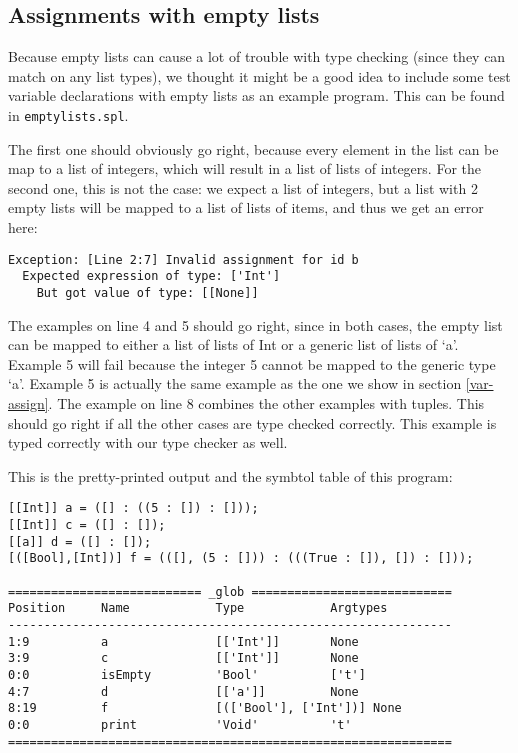 \documentclass[a4paper]{article}
\begin{document}
\subsection{Assignments with empty lists}
Because empty lists can cause a lot of trouble with type checking (since they can match on any list types), we thought it might be a good idea to include some test variable declarations with empty lists as an example program. This can be found in {\tt emptylists.spl}. 

The first one should obviously go right, because every element in the list can be map to a list of integers, which will result in a list of lists of integers. For the second one, this is not the case: we expect a list of integers, but a list with 2 empty lists will be mapped to a list of lists of items, and thus we get an error here:
\begin{verbatim}
Exception: [Line 2:7] Invalid assignment for id b
  Expected expression of type: ['Int']
    But got value of type: [[None]]
\end{verbatim}
The examples on line 4 and 5 should go right, since in both cases, the empty list can be mapped to either a list of lists of Int or a generic list of lists of `a'. Example 5 will fail because the integer 5 cannot be mapped to the generic type `a'. Example 5 is actually the same example as the one we show in section \ref{var-assign}. The example on line 8 combines the other examples with tuples. This should go right if all the other cases are type checked correctly. This example is typed correctly with our type checker as well.

This is the pretty-printed output and the symbtol table of this program: 
\begin{verbatim}
[[Int]] a = ([] : ((5 : []) : []));
[[Int]] c = ([] : []);
[[a]] d = ([] : []);
[([Bool],[Int])] f = (([], (5 : [])) : (((True : []), []) : []));

=========================== _glob ============================
Position     Name            Type            Argtypes            
--------------------------------------------------------------
1:9          a               [['Int']]       None                
3:9          c               [['Int']]       None                
0:0          isEmpty         'Bool'          ['t']               
4:7          d               [['a']]         None                
8:19         f               [(['Bool'], ['Int'])] None                
0:0          print           'Void'          't'                 
==============================================================
\end{verbatim}
\end{document}
